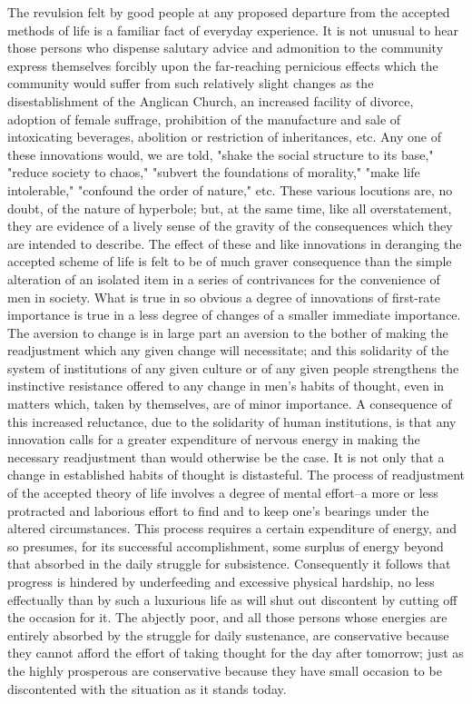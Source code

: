 \documentclass[12pt]{report}
\begin{document}
The revulsion felt by good people at any proposed departure from the
accepted methods of life is a familiar fact of everyday experience. It
is not unusual to hear those persons who dispense salutary advice
and admonition to the community express themselves forcibly upon the
far-reaching pernicious effects which the community would suffer from
such relatively slight changes as the disestablishment of the Anglican
Church, an increased facility of divorce, adoption of female suffrage,
prohibition of the manufacture and sale of intoxicating beverages,
abolition or restriction of inheritances, etc. Any one of these
innovations would, we are told, "shake the social structure to its
base," "reduce society to chaos," "subvert the foundations of morality,"
"make life intolerable," "confound the order of nature," etc. These
various locutions are, no doubt, of the nature of hyperbole; but, at the
same time, like all overstatement, they are evidence of a lively sense
of the gravity of the consequences which they are intended to describe.
The effect of these and like innovations in deranging the accepted
scheme of life is felt to be of much graver consequence than the simple
alteration of an isolated item in a series of contrivances for the
convenience of men in society. What is true in so obvious a degree of
innovations of first-rate importance is true in a less degree of changes
of a smaller immediate importance. The aversion to change is in large
part an aversion to the bother of making the readjustment which any
given change will necessitate; and this solidarity of the system of
institutions of any given culture or of any given people strengthens the
instinctive resistance offered to any change in men's habits of thought,
even in matters which, taken by themselves, are of minor importance. A
consequence of this increased reluctance, due to the solidarity of human
institutions, is that any innovation calls for a greater expenditure of
nervous energy in making the necessary readjustment than would otherwise
be the case. It is not only that a change in established habits of
thought is distasteful. The process of readjustment of the accepted
theory of life involves a degree of mental effort--a more or less
protracted and laborious effort to find and to keep one's bearings under
the altered circumstances. This process requires a certain expenditure
of energy, and so presumes, for its successful accomplishment, some
surplus of energy beyond that absorbed in the daily struggle for
subsistence. Consequently it follows that progress is hindered by
underfeeding and excessive physical hardship, no less effectually than
by such a luxurious life as will shut out discontent by cutting off the
occasion for it. The abjectly poor, and all those persons whose
energies are entirely absorbed by the struggle for daily sustenance, are
conservative because they cannot afford the effort of taking thought for
the day after tomorrow; just as the highly prosperous are conservative
because they have small occasion to be discontented with the situation
as it stands today.
\end{document}
